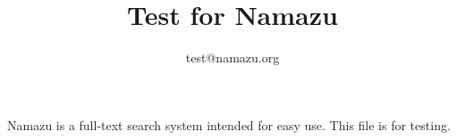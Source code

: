 \documentclass{jarticle}
\title{Test for Namazu}
\author{test@namazu.org}
\begin{document}
\maketitle

Namazu is a full-text search system intended for easy
use.  This file is for testing.
\end{document}
